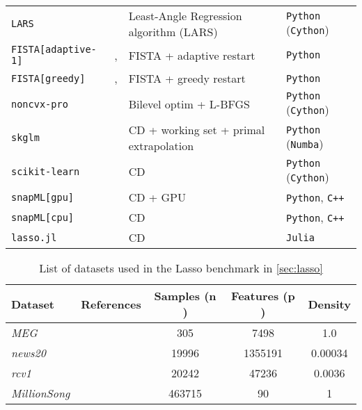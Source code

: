 \documentclass{article}
\begin{document}
\begin{table}[h]
\begin{tabular}{l p{4cm} p{3cm} l}
  \texttt{LARS} & \citet{Efron_Hastie_Johnstone_Tibshirani04}
                & Least-Angle Regression algorithm (LARS)
                & \texttt{Python} (\texttt{Cython})\\
  \texttt{FISTA[adaptive-1]} & \citet[Algo 4]{Liang_22}, \citet{Farrens_20}
                             & FISTA + adaptive restart
                             & \texttt{Python}\\
  \texttt{FISTA[greedy]} &\citet[Algo 5]{Liang_22}, \citet{Farrens_20}
                         & FISTA + greedy restart
                         & \texttt{Python}\\
  \texttt{noncvx-pro} & \citet{Poon_21}
                      & Bilevel optim + L-BFGS
                      & \texttt{Python} (\texttt{Cython})\\
  \texttt{skglm} &\citet{Bertrand_22}
                     & CD + working set + primal extrapolation
                     & \texttt{Python} (\texttt{Numba})\\
  \texttt{scikit-learn} &\citet{Pedregosa_11}
                     & CD
                     & \texttt{Python} (\texttt{Cython})\\
  \texttt{snapML[gpu]} &\citet{Dunner_18}
                     & CD + GPU
                     & \texttt{Python}, \texttt{C++}\\
  \texttt{snapML[cpu]} &\citet{Dunner_18}
                     & CD
                     & \texttt{Python}, \texttt{C++}\\
  \texttt{lasso.jl} & \citet{kornblith2021}
                    & CD
                    & \texttt{Julia}\\
  \bottomrule
\end{tabular}
\label{table:algo-lasso-benchmark}
\end{table}


\begin{table}[h]
  \centering
  \caption{List of datasets used in the Lasso benchmark in \autoref{sec:lasso}}
      \begin{tabular}{llS[table-format=6.0]S[table-format=7.0]S[table-format=1.1e-1,scientific-notation=true]}
        \toprule
        \textbf{Dataset} & \textbf{References} &\textbf{Samples ($\mathbf{n}$)} & {\textbf{Features} ($\mathbf{p}$)} & {\textbf{Density}} \\
        \midrule
\emph{MEG} &\citet{mne} & 305 & 7498 & 1.0 \\        \emph{news20}& \citet{news20} & 19996 & 1355191 & 0.00034  \\ \emph{rcv1} &\citet{rcv1} & 20242 & 47236 &  0.0036 \\ \emph{MillionSong} &\citet{Bertin-Mahieux2011} & 463715 & 90 & 1 \\ \bottomrule
    \end{tabular}
    \label{table:summary_data_lasso}
\end{table}
\end{document}

